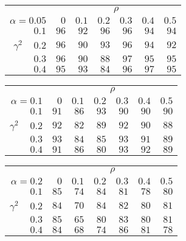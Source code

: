 \begin{tabular}{r|rrrrrr}
\hline\hline
 &\multicolumn{6}{c}{$\rho$} \\ 
 $\alpha = 0.05$ & $0$ & $0.1$ & $0.2$ & $0.3$ & $0.4$ & $0.5$ \\ 
 \hline$0.1$ & $96$ & $92$ & $96$ & $96$ & $94$ & $94$\\ 
$\gamma^2\;\;\;$ $0.2$ & $96$ & $90$ & $93$ & $96$ & $94$ & $92$\\ 
$0.3$ & $96$ & $90$ & $88$ & $97$ & $95$ & $95$\\ 
$0.4$ & $95$ & $93$ & $84$ & $96$ & $97$ & $95$\\ 
 \hline 
 \end{tabular}
 
 \vspace{2em} 
 
\begin{tabular}{r|rrrrrr}
\hline\hline
 &\multicolumn{6}{c}{$\rho$} \\ 
 $\alpha = 0.1$ & $0$ & $0.1$ & $0.2$ & $0.3$ & $0.4$ & $0.5$ \\ 
 \hline$0.1$ & $91$ & $86$ & $93$ & $90$ & $90$ & $90$\\ 
$\gamma^2\;\;\;$ $0.2$ & $92$ & $82$ & $89$ & $92$ & $90$ & $88$\\ 
$0.3$ & $93$ & $84$ & $85$ & $93$ & $91$ & $89$\\ 
$0.4$ & $91$ & $86$ & $80$ & $93$ & $92$ & $89$\\ 
 \hline 
 \end{tabular}
 
 \vspace{2em} 
 
\begin{tabular}{r|rrrrrr}
\hline\hline
 &\multicolumn{6}{c}{$\rho$} \\ 
 $\alpha = 0.2$ & $0$ & $0.1$ & $0.2$ & $0.3$ & $0.4$ & $0.5$ \\ 
 \hline$0.1$ & $85$ & $74$ & $84$ & $81$ & $78$ & $80$\\ 
$\gamma^2\;\;\;$ $0.2$ & $84$ & $70$ & $84$ & $82$ & $80$ & $81$\\ 
$0.3$ & $85$ & $65$ & $80$ & $83$ & $80$ & $81$\\ 
$0.4$ & $84$ & $68$ & $74$ & $86$ & $81$ & $78$\\ 
 \hline 
 \end{tabular}